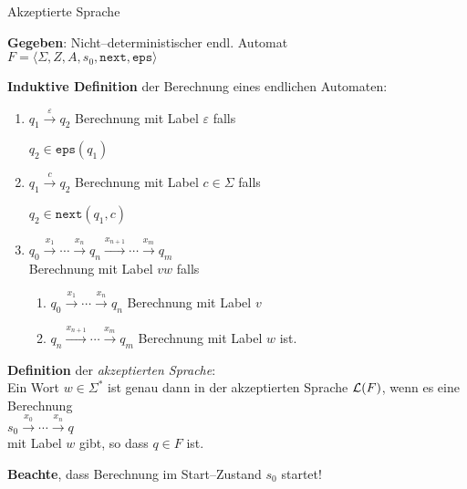 \begin{slide}{}
\normalsize

\begin{center}
  Akzeptierte Sprache
\end{center}
\vspace*{0.5cm}

\footnotesize
\textbf{Gegeben}: Nicht--deterministischer endl. Automat \\[0.3cm]
\hspace*{1.3cm} $F = \langle \Sigma, Z, A, s_0, \mathtt{next}, \mathtt{eps}  \rangle$ 

\textbf{Induktive Definition} der Berechnung eines endlichen Automaten:
\begin{enumerate}
\item $q_1 \stackrel{\varepsilon}{\rightarrow} q_2$ \quad Berechnung mit Label $\varepsilon$ falls 

      $q_2 \in \mathtt{eps}(q_1)$
\item $q_1 \stackrel{c}{\rightarrow} q_2$ \quad Berechnung mit Label $c\in \Sigma$ falls 

      $q_2 \in \mathtt{next}(q_1, c)$
\item $q_0 \stackrel{x_1}{\rightarrow} \cdots \stackrel{x_n}{\rightarrow} q_n \stackrel{x_{n+1}}{\rightarrow} \cdots \stackrel{x_m}{\rightarrow} q_{m}$ \\[0.3cm]
      Berechnung mit Label $vw$ falls 
      \begin{enumerate}
      \item $q_0 \stackrel{x_1}{\rightarrow} \cdots \stackrel{x_n}{\rightarrow} q_n$ Berechnung mit Label $v$
      \item $q_n \stackrel{x_{n+1}}{\rightarrow} \cdots \stackrel{x_m}{\rightarrow} q_{m}$  Berechnung mit Label $w$ ist.
      \end{enumerate}
\end{enumerate}

\textbf{Definition} der \emph{akzeptierten Sprache}: \\[0.3cm]
Ein Wort $w \in \Sigma^*$ ist genau dann in der akzeptierten Sprache ${\cal L}(F)$, wenn es eine Berechnung \\[0.3cm]
\hspace*{1.3cm} $s_0 \stackrel{x_0}{\rightarrow} \cdots \stackrel{x_n}{\rightarrow} q$ \\[0.3cm]
mit Label $w$ gibt, so dass $q \in F$ ist.

\textbf{Beachte}, dass Berechnung im Start--Zustand $s_0$ startet!


\end{slide}
